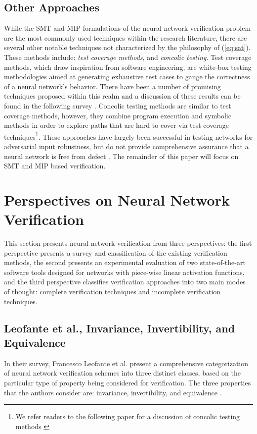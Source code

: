 \documentclass[10pt,conference]{IEEEtran}
\begin{document}
\subsection{Other Approaches}
While the SMT and MIP formulations of the neural network verification problem are the most commonly used techniques within the research literature, there are several other notable techniques not characterized by the philosophy of (\ref{eq:sat}). These methods include: \emph{test coverage methods}, and \emph{concolic testing}. Test coverage methods, which draw inspiration from software engineering, are white-box testing methodologies aimed at generating exhaustive test cases to gauge the correctness of a neural network's behavior. There have been a number of promising techniques proposed within this realm and a discussion of these results can be found in the following survey \cite{XiangVerification2018}. 
Concolic testing methods are similar to test coverage methods, however, they combine program execution and symbolic methods in order to explore paths that are hard to cover via test coverage techniques\footnote{We refer readers to the following paper for a discussion of concolic testing methods \cite{SunTesting2018}}. These approaches have largely been successful in testing networks for adversarial input robustness, but do not provide comprehensive assurance that a neural network is free from defect \cite{XiangVerification2018}. The remainder of this paper will focus on SMT and MIP based verification.

\section{Perspectives on Neural Network Verification \label{sec: Perspectives}}
This section presents neural network verification from three perspectives: the first perspective presents a survey and classification of the existing verification methods, the second presents an experimental evaluation of two state-of-the-art software tools designed for networks with piece-wise linear activation functions, and the third perspective classifies verification approaches into two main modes of thought: complete verification techniques and incomplete verification techniques.
\subsection{Leofante et al., Invariance, Invertibility, and Equivalence}
In their survey, Francesco Leofante et al. present a comprehensive categorization of neural network verification schemes into three distinct classes, based on the particular type of property being considered for verification. The three properties that the authors consider are: invariance, invertibility, and equivalence \cite{LeofanteAdvances2018}.
\end{document}

